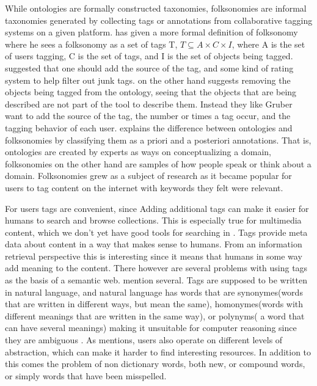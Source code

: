 While ontologies are formally constructed taxonomies, folksonomies are informal taxonomies generated by collecting tags or annotations from collaborative tagging systems on a given platform\citep{Tang2009}. 
\citet{Mika2005} has given a more formal definition of folksonomy where he sees a folksonomy as a set of tags T, 
$T \subseteq A \times C \times I$, where A is the set of users tagging, C is the set of tags, and I is the set of objects being tagged.
\citet{Gruber2007} suggested that one should add the source of the tag, and some kind of rating system to help filter out junk tags. 
\citet{Scerri2008} on the other hand suggests removing the objects being tagged from the ontology, 
seeing that the objects that are being described are not part of the tool to describe them.
Instead they like Gruber want to add the source of the tag, the number or times a tag occur, and the tagging behavior of each user.
\citet{Bang2008} explains the difference between ontologies and folksonomies by classifying them as a priori and a posteriori annotations. 
That is, ontologies are created by experts as ways on conceptualizing a domain, folksonomies on the other hand are samples of how people speak or think about a domain.
Folksonomies grew as a subject of research as it became popular for users to tag content on the internet with keywords they felt were relevant.

For users tags are convenient, since Adding additional tags can make it easier for humans to search and browse collections. 
This is especially true for multimedia content, which we don't yet have good tools for searching in \citep{Weinberger2008}.
Tags provide meta data about content in a way that makes sense to humans. 
From an information retrieval perspective this is interesting since it means that humans in some way add meaning to the content.
There however are several problems with using tags as the basis of a semantic web. \citet{Tang2009} mention several. 
Tags are supposed to be written in natural language, and natural language has words that are synonymes(words that are written in different ways, 
but mean the same), homonymes(words with different meanings that are written in the same way), or polynyms( a word that can have several meanings) 
making it unsuitable for computer reasoning since they are ambiguous \citep{Passant2008}. 
As \citet{Golder2005} mentions, users also operate on different levels of abstraction, which can make it harder to find interesting resources.
In addition to this comes the problem of non dictionary words, both new, or compound words, or simply words that have been misspelled\citep{Tonkin2006}.


